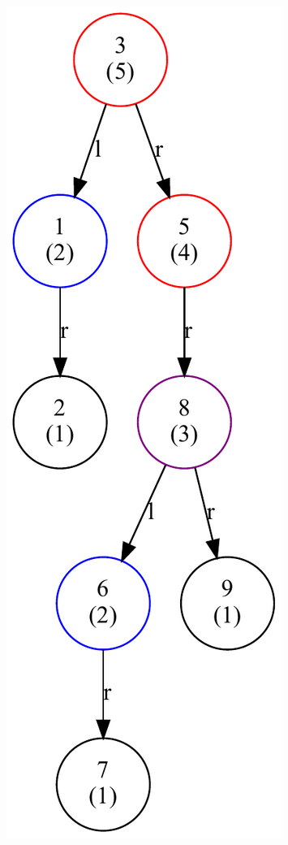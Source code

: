 \begin{figure}[hbt]
{        \includegraphics[scale = 0.32]{img/gv/aufg2_6_Delete4}\label{fig:splay-del4}}
    \qquad
\end{figure}
